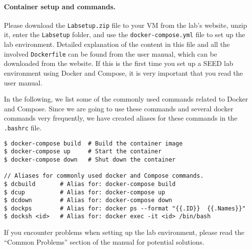 

\paragraph{Container setup and commands.}
Please download the
\texttt{Labsetup.zip} file to your VM from the lab's website,
unzip it, enter the \texttt{Labsetup} folder, and 
use the \texttt{docker-compose.yml} file to 
set up the lab environment. Detailed explanation
of the content in this file and all the involved 
\texttt{Dockerfile} can be found from the 
user manual, which can be downloaded from the website. 
If this is the first time you set up a SEED lab environment
using Docker and Compose, it is very important that you read 
the user manual. 

In the following, we list some of the commonly
used commands related to Docker and Compose. 
Since we are going to use 
these commands and several docker commands very
frequently, we have created aliases for these commands
in the \texttt{.bashrc} file.  


\begin{lstlisting}
$ docker-compose build  # Build the container image
$ docker-compose up     # Start the container
$ docker-compose down   # Shut down the container

// Aliases for commonly used docker and Compose commands. 
$ dcbuild       # Alias for: docker-compose build
$ dcup          # Alias for: docker-compose up
$ dcdown        # Alias for: docker-compose down
$ dockps        # Alias for: docker ps --format "{{.ID}}  {{.Names}}" 
$ docksh <id>   # Alias for: docker exec -it <id> /bin/bash
\end{lstlisting}


If you encounter problems when setting up the lab environment, 
please read the ``Common Problems'' section of the manual
for potential solutions.

